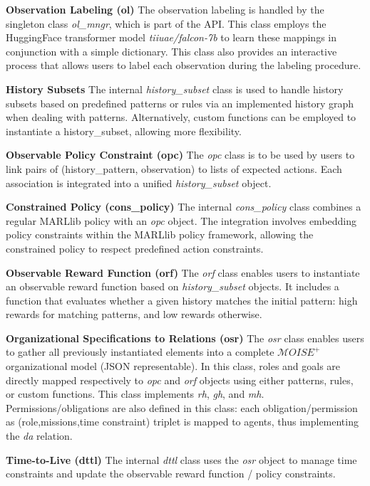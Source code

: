\documentclass[sigconf,anonymous]{aamas}
\begin{document}
\textbf{Observation Labeling (ol)} \quad The observation labeling is handled by the singleton class \textit{ol\_mngr}, which is part of the API. This class employs the HuggingFace transformer model \textit{tiiuae/falcon-7b} to learn these mappings in conjunction with a simple dictionary. This class also provides an interactive process that allows users to label each observation during the labeling procedure.

\textbf{History Subsets} \quad The internal \textit{history\_subset} class is used to handle history subsets based on predefined patterns or rules via an implemented history graph when dealing with patterns. Alternatively, custom functions can be employed to instantiate a history\_subset, allowing more flexibility.

\textbf{Observable Policy Constraint (opc)} \quad The \textit{opc} class is to be used by users to link pairs of (history\_pattern, observation) to lists of expected actions. Each association is integrated into a unified \textit{history\_subset} object.

\textbf{Constrained Policy (cons\_policy)} \quad The internal \textit{cons\_policy} class combines a regular MARLlib policy with an \textit{opc} object. The integration involves embedding policy constraints within the MARLlib policy framework, allowing the constrained policy to respect predefined action constraints.

\textbf{Observable Reward Function (orf)} \quad The \textit{orf} class enables users to instantiate an observable reward function based on \textit{history\_subset} objects. It includes a function that evaluates whether a given history matches the initial pattern: high rewards for matching patterns, and low rewards otherwise.

\textbf{Organizational Specifications to Relations (osr)} \quad The \textit{osr} class enables users to gather all previously instantiated elements into a complete $\mathcal{M}OISE^+$ organizational model (JSON representable). In this class, roles and goals are directly mapped respectively to \textit{opc} and \textit{orf} objects using either patterns, rules, or custom functions. This class implements \textit{rh}, \textit{gh}, and \textit{mh}. Permissions/obligations are also defined in this class: each obligation/permission as (role,missions,time constraint) triplet is mapped to agents, thus implementing the \textit{da} relation.

\textbf{Time-to-Live (dttl)} \quad The internal \textit{dttl} class uses the \textit{osr} object to manage time constraints and update the observable reward function / policy constraints.
\end{document}
